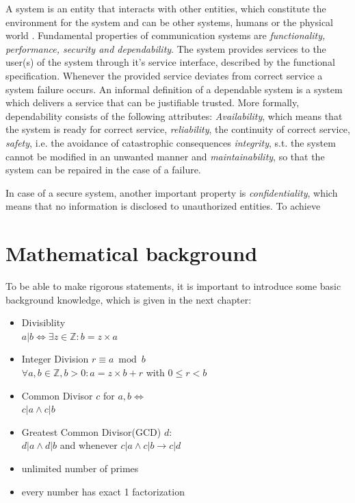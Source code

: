 A system is an entity that interacts with other entities, which constitute the environment for the system and
can be other systems, humans or the physical world \cite{1335465}. Fundamental properties of communication systems
are \textit{functionality, performance, security and dependability}. The system provides services to the user(s) 
of the system through it's service interface, described by the functional specification. Whenever the provided service
deviates from correct service a system failure occurs. 
An informal definition of a dependable system is a system which delivers a service that can be justifiable trusted. More formally,
dependability consists of the following attributes:
\textit{Availability}, which means that the system is ready for correct service, \textit{reliability}, the continuity of correct service,
\textit{safety}, i.e. the avoidance of catastrophic consequences \textit{integrity}, s.t. the system cannot be modified in an unwanted manner
and \textit{maintainability}, so that the system can be repaired in the case of a failure.

In case of a secure system, another important property is \textit{confidentiality}, which means that no information is disclosed to unauthorized 
entities.
To achieve 


\section{Mathematical background}

To be able to make rigorous statements, it is important to introduce some basic background knowledge, which
is given in the next chapter:

\begin{itemize}
 \item Divisiblity
 \\
$a | b \iff \exists z \in \mathbb{Z}: b = z \times a$
 \item Integer Division $r \equiv a \bmod b$ 
 \\
 $ \forall a, b \in \mathbb{Z}, b > 0:  a = z \times b + r $ with $ 0 \leq r < b$
 \item Common Divisor $c$ for $a, b \iff$
 \\
 $c | a \wedge c | b$
 \item Greatest Common Divisor(GCD) $d$:
 \\
 $d | a \wedge d | b$ and whenever $c | a \wedge c | b \rightarrow c | d$
 
 \item unlimited number of primes
 \item every number has exact 1 factorization 
\end{itemize}

